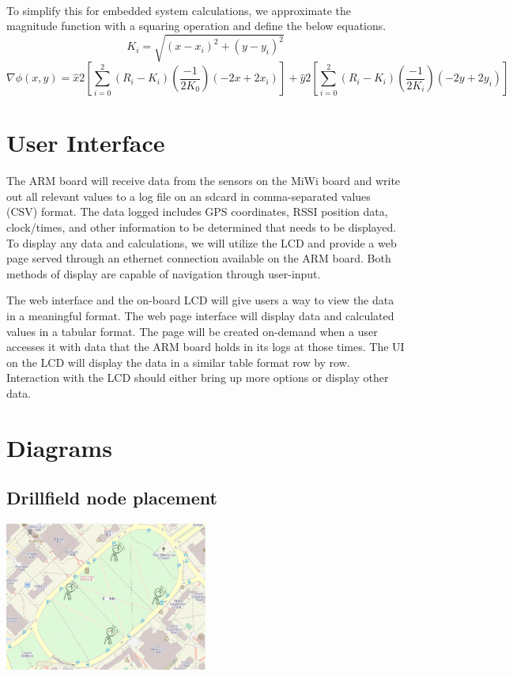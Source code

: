 \documentclass{article}
\begin{document}
\paragraph*{}To simplify this for embedded system calculations, we approximate the magnitude function with a squaring operation and define the below equations.
\begin{equation}
K_{i} = \sqrt{\left(x-x_{i}\right)^{2} + \left(y-y_{i}\right)^{2}}
\end{equation}
\begin{equation}
\nabla\phi\left(x,y\right) = \hat{x}2\left[\sum_{i=0}^{2}\left(R_{i}-K_{i}\right)\left(\frac{-1}{2K_{0}}\right)\left(-2x+2x_{i}\right)\right] + \hat{y}2\left[\sum_{i=0}^{2}\left(R_{i}-K_{i}\right)\left(\frac{-1}{2K_{i}}\right)\left(-2y+2y_{i}\right)\right]
\end{equation}

\section*{User Interface}
\paragraph*{}
The ARM board will receive data from the sensors on the MiWi board and write out all relevant values to a log file on an sdcard in comma-separated values (CSV) format. The data logged includes GPS coordinates, RSSI position data, clock/times, and other information to be determined that needs to be displayed. To display any data and calculations, we will utilize the LCD and provide a web page served through an ethernet connection available on the ARM board. Both methods of display are capable of navigation through user-input.

The web interface and the on-board LCD will give users a way to view the data in a meaningful format. The web page interface will display data and calculated values in a tabular format. The page will be created on-demand when a user accesses it with data that the ARM board holds in its logs at those times. The UI on the LCD will display the data in a similar table format row by row. Interaction with the LCD should either bring up more options or display other data.

\section*{Diagrams}
\subsection*{Drillfield node placement}
\includegraphics[width=0.5\textwidth]{node_placement}
\end{document}

